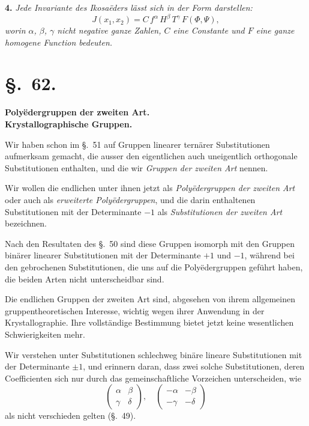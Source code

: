 \documentclass[12pt,a4paper]{article}
\newcommand{\sect}[1]{\section*{{\S.~#1.}}\addcontentsline{toc}{section}{\S.~#1}}
\begin{document}
\medskip\noindent
\textbf{4.} \emph{Jede Invariante des Ikosaëders lässt sich in der Form darstellen:}
\begin{equation}\label{eq:61.2}
\tag{2}
J(x_{1},x_{2}) = C\,f^{\alpha}\,H^{\beta}\,T^{\gamma}\,F(\Phi,\Psi),
\end{equation}
\emph{worin $\alpha$, $\beta$, $\gamma$ nicht negative ganze Zahlen, $C$ eine Constante und $F$ eine ganze homogene Function bedeuten.}

\newpage
\sect{62}
\begin{center}
\textbf{Polyëdergruppen der zweiten Art.\\Krystallographische Gruppen.}
\end{center}
\label{sec:62}

Wir haben schon im \S.~51 auf Gruppen linearer ternärer Substitutionen aufmerksam gemacht, die ausser den eigentlichen auch uneigentlich orthogonale Substitutionen enthalten, und die wir \emph{Gruppen der zweiten Art} nennen.

Wir wollen die endlichen unter ihnen jetzt als \emph{Polyëdergruppen der zweiten Art} oder auch als \emph{erweiterte Polyëdergruppen}, und die darin enthaltenen Substitutionen mit der Determinante $-1$ als \emph{Substitutionen der zweiten Art} bezeichnen.

Nach den Resultaten des \S.~50 sind diese Gruppen isomorph mit den Gruppen binärer linearer Substitutionen mit der Determinante $+1$ und $-1$, während bei den gebrochenen Substitutionen, die uns auf die Polyëdergruppen geführt haben, die beiden Arten nicht unterscheidbar sind.

Die endlichen Gruppen der zweiten Art sind, abgesehen von ihrem allgemeinen gruppentheoretischen Interesse, wichtig wegen ihrer Anwendung in der Krystallographie. Ihre vollständige Bestimmung bietet jetzt keine wesentlichen Schwierigkeiten mehr.

Wir verstehen unter Substitutionen schlechweg binäre lineare Substitutionen mit der Determinante $\pm 1$, und erinnern daran, dass zwei solche Substitutionen, deren Coefficienten sich nur durch das gemeinschaftliche Vorzeichen unterscheiden, wie
\[
\begin{pmatrix}\alpha&\beta\\\gamma&\delta\end{pmatrix},
\quad
\begin{pmatrix}-\alpha&-\beta\\-\gamma&-\delta\end{pmatrix}
\]
als nicht verschieden gelten (\S.~49).
\end{document}
